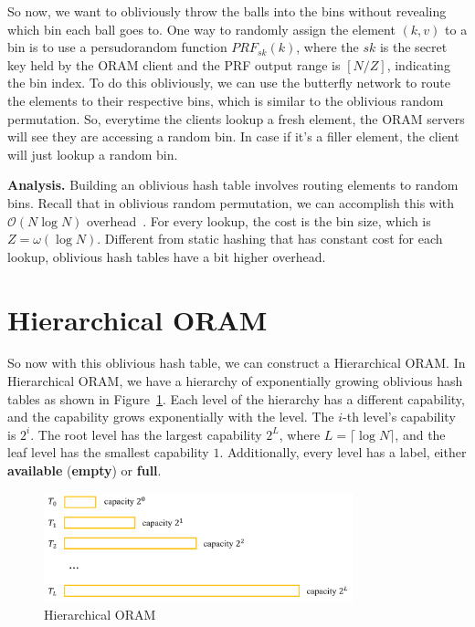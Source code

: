 So now, we want to obliviously throw the balls into the bins without revealing which bin each ball goes to.
One way to randomly assign the element $(k, v)$ to a bin is to use a persudorandom function $PRF_{sk}(k)$, where the $sk$ is the secret key held by the ORAM client and the PRF output range is $[N/Z]$, indicating the bin index.
To do this obliviously, we can use the butterfly network to route the elements to their respective bins, which is similar to the oblivious random permutation.
So, everytime the clients lookup a fresh element, the ORAM servers will see they are accessing a random bin. In case if it's a filler element, the client will just lookup a random bin.

\textbf{Analysis.} Building an oblivious hash table involves routing elements to random bins. 
Recall that in oblivious random permutation, we can accomplish this with $\mathcal{O}(N \log N)$ overhead~\cite{domulticore, tianyao-sort}. 
For every lookup, the cost is the bin size, which is $Z = \omega(\log N)$.
Different from static hashing that has constant cost for each lookup, oblivious hash tables have a bit higher overhead.

\section{Hierarchical ORAM}

So now with this oblivious hash table, we can construct a Hierarchical ORAM.
In Hierarchical ORAM, we have a hierarchy of exponentially growing oblivious hash tables as shown in Figure~\ref{fig:oram}.
Each level of the hierarchy has a different capability, and the capability grows exponentially with the level.
The $i$-th level's capability is $2^i$.
The root level has the largest capability $2^L$, where $L = \lceil \log N \rceil$, and the leaf level has the smallest capability $1$.
Additionally, every level has a label, either \textbf{available} (\textbf{empty}) or \textbf{full}.

\begin{figure}[!h]
  \centering
  \includegraphics[width=0.8\textwidth]{fig1.png}
  \caption{Hierarchical ORAM}
  \label{fig:oram}
\end{figure}

